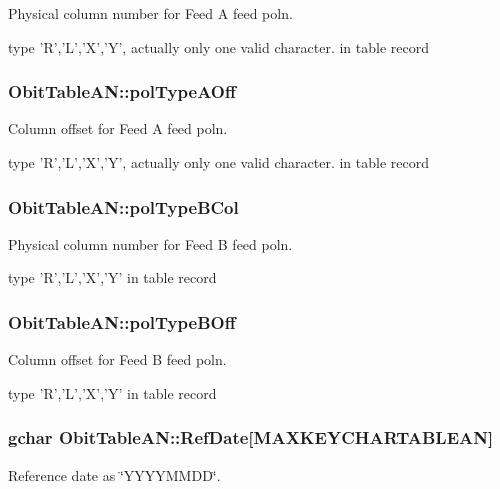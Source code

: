 Physical column number for Feed A feed poln. 

type 'R','L','X','Y', actually only one valid character. in table record 
\subsubsection{ {\bf Obit\-Table\-AN::pol\-Type\-AOff}}\label{structObitTableAN_o58}


Column offset for Feed A feed poln. 

type 'R','L','X','Y', actually only one valid character. in table record 
\subsubsection{ {\bf Obit\-Table\-AN::pol\-Type\-BCol}}\label{structObitTableAN_o63}


Physical column number for Feed B feed poln. 

type 'R','L','X','Y' in table record 
\subsubsection{ {\bf Obit\-Table\-AN::pol\-Type\-BOff}}\label{structObitTableAN_o62}


Column offset for Feed B feed poln. 

type 'R','L','X','Y' in table record 
\subsubsection{\setlength{\rightskip}{0pt plus 5cm}gchar {\bf Obit\-Table\-AN::Ref\-Date}[MAXKEYCHARTABLEAN]}\label{structObitTableAN_o21}


Reference date as \char`\"{}YYYYMMDD\char`\"{}. 

